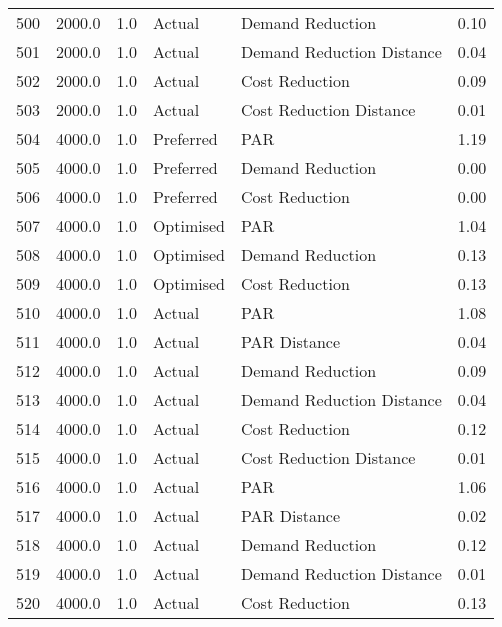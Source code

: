 \begin{longtable}{lrrllr}
500  &       2000.0 &     1.0 &         Actual &           Demand Reduction &   0.10 \\
501  &       2000.0 &     1.0 &         Actual &  Demand Reduction Distance &   0.04 \\
502  &       2000.0 &     1.0 &         Actual &             Cost Reduction &   0.09 \\
503  &       2000.0 &     1.0 &         Actual &    Cost Reduction Distance &   0.01 \\
504  &       4000.0 &     1.0 &      Preferred &                        PAR &   1.19 \\
505  &       4000.0 &     1.0 &      Preferred &           Demand Reduction &   0.00 \\
506  &       4000.0 &     1.0 &      Preferred &             Cost Reduction &   0.00 \\
507  &       4000.0 &     1.0 &      Optimised &                        PAR &   1.04 \\
508  &       4000.0 &     1.0 &      Optimised &           Demand Reduction &   0.13 \\
509  &       4000.0 &     1.0 &      Optimised &             Cost Reduction &   0.13 \\
510  &       4000.0 &     1.0 &         Actual &                        PAR &   1.08 \\
511  &       4000.0 &     1.0 &         Actual &               PAR Distance &   0.04 \\
512  &       4000.0 &     1.0 &         Actual &           Demand Reduction &   0.09 \\
513  &       4000.0 &     1.0 &         Actual &  Demand Reduction Distance &   0.04 \\
514  &       4000.0 &     1.0 &         Actual &             Cost Reduction &   0.12 \\
515  &       4000.0 &     1.0 &         Actual &    Cost Reduction Distance &   0.01 \\
516  &       4000.0 &     1.0 &         Actual &                        PAR &   1.06 \\
517  &       4000.0 &     1.0 &         Actual &               PAR Distance &   0.02 \\
518  &       4000.0 &     1.0 &         Actual &           Demand Reduction &   0.12 \\
519  &       4000.0 &     1.0 &         Actual &  Demand Reduction Distance &   0.01 \\
520  &       4000.0 &     1.0 &         Actual &             Cost Reduction &   0.13 \\

\end{longtable}
